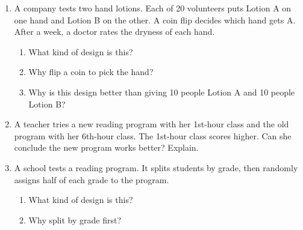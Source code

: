 \documentclass[11pt]{article}
\begin{document}
\begin{enumerate}
\item A company tests two hand lotions. Each of 20 volunteers puts Lotion A on one hand and Lotion B on the other. A coin flip decides which hand gets A. After a week, a doctor rates the dryness of each hand.
\begin{enumerate}[itemsep=1em]
  \item What kind of design is this? 
  \item Why flip a coin to pick the hand? 
  \work{3em}
  \item Why is this design better than giving 10 people Lotion A and 10 people Lotion B?

\end{enumerate}
\work{2em}

\item A teacher tries a new reading program with her 1st-hour class and the old program with her 6th-hour class. The 1st-hour class scores higher. Can she conclude the new program works better? Explain.

\work{5em}

\item A school tests a reading program. It splits students by grade, then randomly assigns half of each grade to the program.
\begin{enumerate}[itemsep=1em]
  \item What kind of design is this? 
  \work{1.5em}
  \item Why split by grade first?

\end{enumerate}

\end{enumerate}
\end{document}

